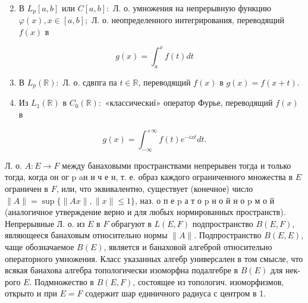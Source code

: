 \documentclass[10pt]{article}
\begin{document}
\begin{enumerate}

  \setcounter{enumi}{1}

  \item В $L_{p}[a, b]$ или $C[a, b]:$ Л. о. умножения на непрерывную функцию $\varphi(x), x \in[a, b] ;$ Л. о. неопределенного интегрирования, переводящий $f(x)$ в

\end{enumerate}



\[

g(x)=\int_{a}^{x} f(t) d t

\]



\begin{enumerate}

  \setcounter{enumi}{2}

  \item В $L_{p}(\mathbb{R}):$ Л. о. сдвпга па $t \in \mathbb{R}$, переводящий $f(x)$ в $g(x)=f(x+t)$.



  \item Из $L_{1}(\mathbb{R})$ в $C_{0}(\mathbb{R}):$ «классическиї» оператор Фурье, переводящий $f(x)$ в



\end{enumerate}



\[

g(x)=\int_{-\infty}^{+\infty} f(t) e^{-i x t} d t .

\]



Л. о. $A: E \rightarrow F$ между банаховыми пространствами непрерывен тогда и только тогда, когда он ог p aн и ч е н, т. е. образ каждого ограниченного множества в $E$ ограничен в $F$, или, что эквивалентно, существует (конечное) число $\|A\|=\sup \{\|A x\|,\|x\| \leqslant 1\}$, наз. о п е $\mathrm{p}$ а т о $\mathrm{p}$ н о й н о $\mathrm{p}$ м о й (аналогичное утверждение верно и для любых нормированных пространств). Непрерывные Л. о. из $E$ в $F$ обрагуют в $L(E, F)$ подпространство $B(E, F)$, являющееся банаховым относительно нормы $\|A\|$. Подпространство $B(E, E)$, чаще обозначаемое $B(E)$, является и банаховой алгеброй относительно операторного умножения. Класс указанных алгебр универсален в том смысле, что всякая банахова алгебра топологически изоморфна подалгебре в $B(E)$ для нек-рого $E$. Подмножество в $B(E, F)$, состоящее из топологич. изоморфизмов, открыто и при $E=F$ содержит шар единичного радиуса с центром в 1.
\end{document}
